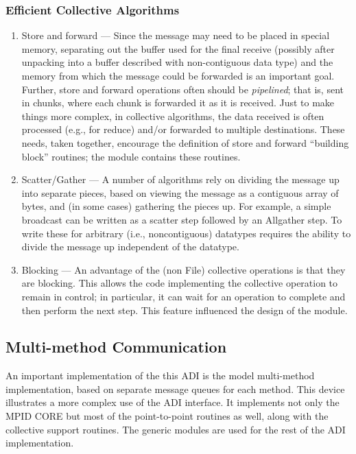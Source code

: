 \documentclass{article}
\begin{document}
\subsubsection{Efficient Collective Algorithms}
\begin{enumerate}
\item Store and forward --- Since the message may need to be placed in
special memory, separating out the buffer used for the final receive
(possibly after unpacking into a buffer described with non-contiguous
data type) and the memory from which the message could be forwarded is
an important goal.  Further, store and
forward operations often should be \emph{pipelined}; that is, sent in
chunks, where each chunk is forwarded it as it is received.
Just to make things more complex, in collective algorithms, the data
received is often processed (e.g., for reduce) and/or forwarded to
multiple destinations.  These needs, taken together, encourage the
definition of store and forward ``building block'' routines; the 
module contains these routines.

\item Scatter/Gather --- A number of algorithms rely on dividing the
message up into separate pieces, based on viewing the message as a
contiguous array of bytes, and (in some cases) gathering the pieces
up.  For example, a simple broadcast can be written as a scatter step
followed by an Allgather step.  To write these for arbitrary (i.e.,
noncontiguous) datatypes requires the ability to divide the message up
independent of the datatype.  

\item Blocking --- An advantage of the (non File) collective
operations is that they are blocking.  This allows the code
implementing the collective operation to remain in control; in
particular, it can wait for an operation to complete and then perform
the next step.  This feature influenced the design of the
 module.
\end{enumerate}

\subsection{Multi-method Communication}
An important implementation of the this ADI is the model multi-method
implementation, based on separate message queues for each method.
This device illustrates a more complex use of the ADI interface.  It
implements not only the MPID CORE but most of the point-to-point
routines as well, along with the collective support routines.  The
generic modules are used for the rest of the ADI implementation.
\end{document}
